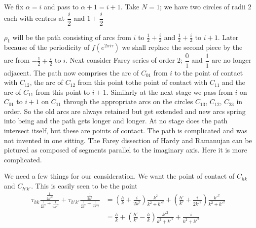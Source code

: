 We fix $\alpha=i$ and pass to $\alpha + 1= i +1$. Take $N=1$; we have
two circles of radii 2 each with centres at $\dfrac{i}{2}$ and
$1+\dfrac{i}{2}$ 

\begin{figure}[H]
\end{figure}
$\rho_1$ will be the path consisting of arcs from $i$ to $\frac{1}{2}
+ \frac{i}{2}$ and $\frac{1}{2} + \frac{i}{2}$ to $i+1$. Later because
of the periodicity of $f(e^{2\pi i \tau})$ we shall replace the second
piece by the arc from $- \frac{1}{2} + \frac{i}{2}$ to $i$. Next
consider Farey series of order 2; $\dfrac{0}{1}$ and $\dfrac{1}{1}$
are no longer adjacent. The path now comprises the arc of $C_{01}$
from $i$ to the point of contact with $C_{12}$, the arc of $C_{12}$
from this point to\pageoriginale the point of contact with $C_{11}$
and the arc of $C_{11}$ from this point to $i+1$. Similarly at the
next stage we pass from $i$ on $C_{01}$ to $i+1$ on $C_{11}$ through
the appropriate arcs on the circles $C_{13}$, $C_{12}$, $C_{23}$ in
order. So the old arcs are always retained but get extended and new
arcs spring into being and the path gets longer and longer. At no
stage does the path intersect itself, but these are points of
contact. The path is complicated and was not invented in one
sitting. The Farey dissection of Hardy and Ramanujan can be pictured
as composed of segments parallel to the imaginary axis. Here it is more
complicated. 

We need a few things for our consideration. We want the point of
contact of $C_{hk}$ and $C_{h' k'}$. This is easily seen to be the
point 
\begin{align*}
  \tau_{hk} \frac{\frac{1}{2k'^2}}{\frac{1}{2k^2}+ \frac{1}{2k'^2}} +
  \tau_{h'k'} \frac{\frac{1}{2k^2}}{\frac{1}{2k^2} + \frac{1}{2k'2}} &
  =
  \left( \frac{h}{k} + \frac{i}{2k^2}\right) \frac{k^2}{k^2+ k'^2} +
  \left( \frac{h'}{k'} + \frac{i}{2k'^2}\right) \frac{k'^2}{k^2 +
    k'^2} \\
  & = \frac{h}{k} + \left(\frac{h'}{k'} - \frac{h}{k} \right)
  \frac{k'^2}{k^2+ k'^2} + \frac{i}{k^2 + k'^2}
\end{align*}

